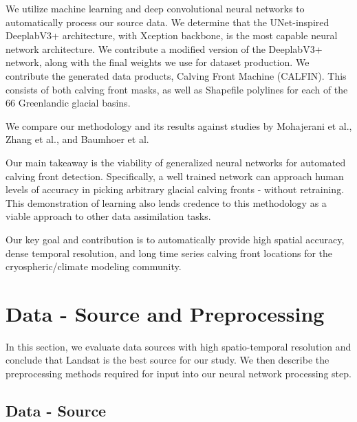 \documentclass[tc, manuscript]{copernicus}
\begin{document}
We utilize machine learning and deep convolutional neural networks to automatically process our source data. We determine that the UNet-inspired DeeplabV3+ architecture, with Xception backbone, is the most capable neural network architecture. We contribute a modified version of the DeeplabV3+ network, along with the final weights we use for dataset production. We contribute the generated data products, Calving Front Machine (CALFIN). This consists of both calving front masks, as well as Shapefile polylines for each of the 66 Greenlandic glacial basins.

We compare our methodology and its results against studies by Mohajerani et al., Zhang et al., and Baumhoer et al.

Our main takeaway is the viability of generalized neural networks for automated calving front detection. Specifically, a well trained network can approach human levels of accuracy in picking arbitrary glacial calving fronts - without retraining. This demonstration of learning also lends credence to this methodology as a viable approach to other data assimilation tasks.

Our key goal and contribution is to automatically provide high spatial accuracy, dense temporal resolution, and long time series calving front locations for the cryospheric/climate modeling community.

\section{Data - Source and Preprocessing}
In this section, we evaluate data sources with high spatio-temporal resolution and conclude that Landsat is the best source for our study. We then describe the preprocessing methods required for input into our neural network processing step.

\subsection{Data - Source}
\end{document}
